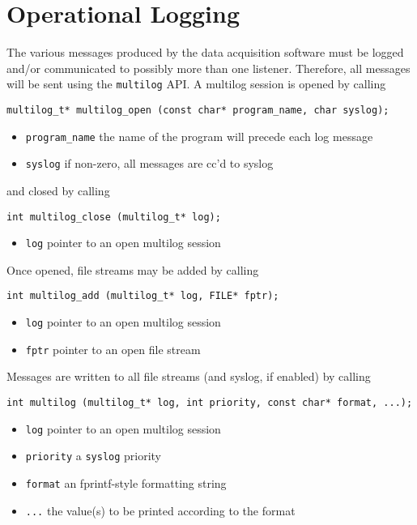 \chapter{Operational Logging}

The various messages produced by the data acquisition software must be
logged and/or communicated to possibly more than one listener.  Therefore,
all messages will be sent using the {\tt multilog} API.  A multilog session
is opened by calling
\begin{verbatim}
multilog_t* multilog_open (const char* program_name, char syslog);
\end{verbatim}

\begin{itemize}
\item {\tt program\_name} the name of the program will precede each log message

\item {\tt syslog} if non-zero, all messages are cc'd to syslog
\end{itemize}
and closed by calling
\begin{verbatim}
int multilog_close (multilog_t* log);
\end{verbatim}

\begin{itemize}
\item {\tt log} pointer to an open multilog session
\end{itemize}
Once opened, file streams may be added by calling
\begin{verbatim}
int multilog_add (multilog_t* log, FILE* fptr);
\end{verbatim}

\begin{itemize}
\item {\tt log} pointer to an open multilog session

\item {\tt fptr} pointer to an open file stream
\end{itemize}
Messages are written to all file streams (and syslog, if enabled) by calling
\begin{verbatim}
int multilog (multilog_t* log, int priority, const char* format, ...);
\end{verbatim}

\begin{itemize}
\item {\tt log} pointer to an open multilog session

\item {\tt priority} a {\tt syslog} priority

\item {\tt format} an fprintf-style formatting string

\item {\tt ...} the value(s) to be printed according to the format
\end{itemize}

